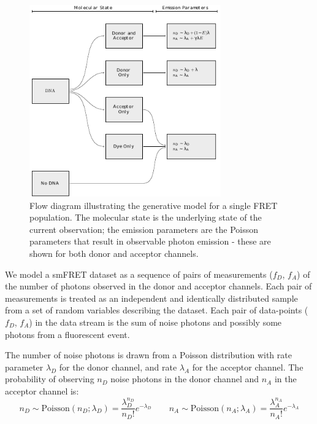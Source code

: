 \begin{figure}
   \begin{center}
      \includegraphics*[width=3.25in]{inference/fig2_model_flow_diagram.pdf}
      \caption{Flow diagram illustrating the generative model for a single FRET population.  The molecular state is the underlying state of the current observation; the emission parameters are the Poisson parameters that result in observable photon emission - these are shown for both donor and acceptor channels.}
      \label{fig:flow_single}
   \end{center}
\end{figure}

We model a smFRET dataset as a sequence of pairs of measurements ($f_D$, $f_A$) of the number of photons observed in the donor and acceptor channels. Each pair of measurements is treated as an independent and identically distributed sample from a set of random variables describing the dataset. Each pair of data-points ($f_D$, $f_A$) in the data stream is the sum of noise photons and possibly some photons from a fluorescent event. 

The number of noise photons is drawn from a Poisson distribution with rate parameter $\lambda_D$ for the donor channel, and rate $\lambda_A$ for the acceptor channel. The probability of observing $n_D$ noise photons in the donor channel and $n_A$ in the acceptor channel is:
\begin{equation}
n_{D} \sim \text{Poisson}(n_{D}; \lambda_{D}) = \frac{\lambda_{D}^{n_{D}}}{n_{D}!}e^{-\lambda_{D}}
\qquad
n_{A} \sim \text{Poisson}(n_{A}; \lambda_{A}) = \frac{\lambda_{A}^{n_{A}}}{n_{A}!}e^{-\lambda_{A}}
\end{equation}

